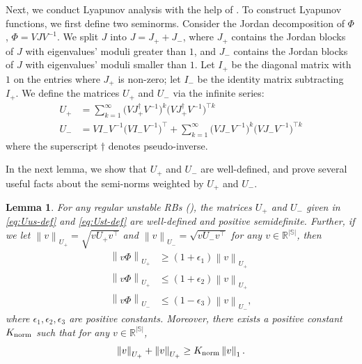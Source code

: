 \documentclass[11pt,letterpaper]{article}
\theoremstyle{plain}
\newtheorem{lemma}{Lemma}
\theoremstyle{definition}
\theoremstyle{remark}
\newcommand{\norm}[1]{\left\lVert#1\right\rVert}
\newcommand{\R}{\mathbb{R}}
\newcommand{\sspa}{\mathbb{S}}
\newcommand{\gapus}{\epsilon_1} %
\newcommand{\gapusmax}{\epsilon_2}
\newcommand{\gapst}{\epsilon_3}
\newcommand{\subus}{+}%
\newcommand{\subst}{-}%
\newcommand{\Jus}{J_{\subus}}
\newcommand{\Jst}{J_{\subst}}
\newcommand{\Ius}{I_{\subus}}
\newcommand{\Ist}{I_{\subst}}
\newcommand{\Uus}{U_{\subus}}
\newcommand{\Ust}{U_{\subst}}
\newcommand{\Knorm}{K_{\textup{norm}}}
\begin{document}
Next, we conduct Lyapunov analysis with the help of .  To construct Lyapunov functions, we first define two seminorms. 
Consider the Jordan decomposition of $\Phi$, $\Phi = V J V^{-1}$. We split $J$ into $J = \Jus + \Jst$, where $\Jus$ contains the Jordan blocks of $J$ with eigenvalues' moduli greater than $1$, and $\Jst$ contains the Jordan blocks of $J$ with eigenvalues' moduli smaller than $1$. 
Let $\Ius$ be the diagonal matrix with $1$ on the entries where $\Jus$ is non-zero; let $\Ist$ be the identity matrix subtracting $\Ius$.  
We define the matrices $\Uus$ and $\Ust$ via the infinite series:
\begin{align}
    \label{eq:Uus-def}
    \Uus &= \sum_{k=1}^\infty \big(V \Jus^{\dagger} V^{-1}\big)^k \big(V \Jus^{\dagger} V^{-1}\big)^{\top k}  \\
    \label{eq:Ust-def}
    \Ust &= V \Ist V^{-1}  \big(V \Ist V^{-1}\big)^{\top} + \sum_{k=1}^\infty \big(V \Jst V^{-1} \big)^k \big(V \Jst V^{-1}\big)^{\top k}
\end{align}
where the superscript $\dagger$ denotes pseudo-inverse. 

In the next lemma, we show that $\Uus$ and $\Ust$ are well-defined, and prove several useful facts about the semi-norms weighted by $\Uus$ and $\Ust$. 

\begin{lemma}\label{lem:uus-ust-properties}
    For any regular unstable RBs (), 
    the matrices $\Uus$ and $\Ust$ given in \eqref{eq:Uus-def} and \eqref{eq:Ust-def} are well-defined and positive semidefinite. 
    Further, if we let $\norm{v}_{\Uus} = \sqrt{v \Uus v^\top}$ and $\norm{v}_{\Ust} = \sqrt{v \Ust v^\top}$ for any $v\in \R^{|\sspa|}$, then 
    \begin{align}
        \label{eq:Uus-expansion}
        \norm{v \Phi}_{\Uus} &\geq (1 + \gapus) \norm{v}_{\Uus} \\
        \label{eq:Uus-expansion-max}
        \norm{v \Phi}_{\Uus} &\leq (1 + \gapusmax) \norm{v }_{\Uus} \\
        \label{eq:Ust-contraction}
        \norm{v \Phi}_{\Ust} &\leq (1-\gapst) \norm{v }_{\Ust}, 
    \end{align}
    where $\gapus, \gapusmax, \gapst$ are positive constants. 
    Moreover, there exists a positive constant $\Knorm$ such that for any $v\in \R^{|\sspa|}$,  
    \begin{equation}
        \label{eq:Uus-plus-Ust-strength}
         \norm{v}_{\Uus} +  \norm{v}_{\Uus}  \geq \Knorm \norm{v}_1.
    \end{equation}
\end{lemma}
\end{document}
